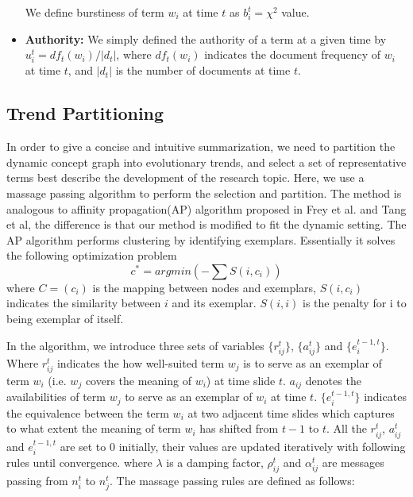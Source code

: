 \begin{itemize}
We define burstiness of term $w_i$ at time $t$ as $b_i^t = \chi^2$ value.

\item \textbf{Authority:}
We simply defined the authority of a term at a given time by $u_i^t=df_t(w_i)/|d_t|$, where $df_t(w_i)$ indicates the document frequency of $w_i$ at time $t$, and $|d_t|$ is the number of documents at time $t$.
\end{itemize}




\subsection{Trend Partitioning}
In order to give a concise and intuitive summarization, we need to partition the dynamic concept graph into evolutionary trends, and select a set of representative terms best describe the development of the research topic. Here, we use a massage passing algorithm to perform the selection and partition. The method is analogous to affinity propagation(AP) algorithm proposed in Frey et al. and Tang et al, the difference is that our method is modified to fit the dynamic setting. The AP algorithm performs clustering by identifying exemplars. Essentially it solves the following optimization problem
$$c^* = argmin(-\sum S(i,c_i) )$$
where $C=(c_i)$ is the mapping between nodes and exemplars, $S(i,c_i)$ indicates the similarity between $i$ and its exemplar. $S(i,i)$ is the penalty for i to being exemplar of itself.

In the algorithm, we introduce three sets of variables $\{r_{ij}^t\}$, $\{a_{ij}^t\}$ and $\{e_i^{t-1,t}\}$. Where $r_{ij}^t$ indicates the how well-suited term $w_j$ is to serve as an exemplar of term $w_i$ (i.e. $w_j$ covers the meaning of $w_i$) at time slide $t$. $a_{ij}$ denotes the availabilities of term $w_j$ to serve as an exemplar of $w_i$ at time $t$. $\{e_i^{t-1,t}\}$ indicates the equivalence between the term $w_i$ at two adjacent time slides which captures to what extent the meaning of term $w_i$ has shifted from $t-1$ to $t$.
All the $r_{ij}^t$, $a_{ij}^t$ and $e_i^{t-1,t}$ are set to $0$ initially, their values are updated iteratively with following rules until convergence.
where $\lambda$ is a damping factor, $\rho_{ij}^t$ and $\alpha_{ij}^t$ are messages passing from $n_i^t$ to $n_j^t$. The massage passing rules are defined as follows:


